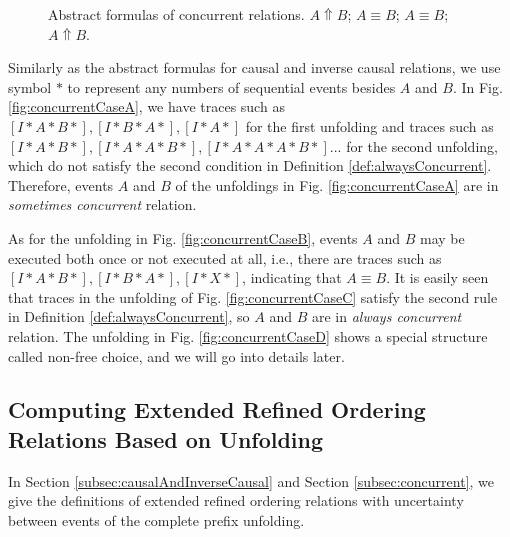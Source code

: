 \documentclass{llncs}
\begin{document}
\begin{figure}[ht]
{\begin{minipage}[b]{0.45\textwidth}
	\end{minipage}
	\label{fig:concurrentCaseC}
}
\caption{Abstract formulas of concurrent relations.  $A\Uparrow B$;  $A\equiv B$;  $A\equiv B$;  $A\Uparrow B$.}
\label{fig:concurrentCases}
\end{figure}

Similarly as the abstract formulas for causal and inverse causal relations, we use symbol $*$ to represent any numbers of sequential events besides $A$ and $B$. In Fig. \ref{fig:concurrentCaseA}, we have traces such as $[I*A*B*],[I*B*A*],[I*A*]$ for the first unfolding and traces such as $[I*A*B*],[I*A*A*B*],[I*A*A*A*B*]...$ for the second unfolding, which do not satisfy the second condition in Definition \ref{def:alwaysConcurrent}. Therefore, events $A$ and $B$ of the unfoldings in Fig. \ref{fig:concurrentCaseA} are in \textit{sometimes concurrent} relation.

As for the unfolding in Fig. \ref{fig:concurrentCaseB}, events $A$ and $B$ may be executed both once or not executed at all, i.e., there are traces such as $[I*A*B*],[I*B*A*],[I*X*]$, indicating that $A\equiv B$. It is easily seen that traces in the unfolding of Fig. \ref{fig:concurrentCaseC} satisfy the second rule in Definition \ref{def:alwaysConcurrent}, so $A$ and $B$ are in \textit{always concurrent} relation. The unfolding in Fig. \ref{fig:concurrentCaseD} shows a special structure called non-free choice, and we will go into details later.

\subsection{Computing Extended Refined Ordering Relations Based on Unfolding}\label{subsec:computationOfRelations}
In Section \ref{subsec:causalAndInverseCausal} and Section \ref{subsec:concurrent}, we give the definitions of extended refined ordering relations with uncertainty between events of the complete prefix unfolding. 
\end{document}
